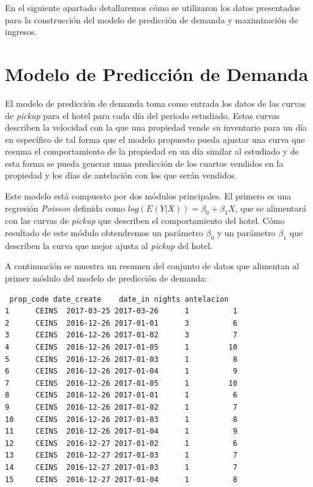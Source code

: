 En el siguiente apartado detallaremos cómo se utilizaron los datos presentados para la construcción del modelo de predicción de demanda y maximización de ingresos.


\section*{Modelo de Predicción de Demanda}

El modelo de predicción de demanda toma como entrada los datos de las curvas de \emph{pickup} para el hotel para cada día del periodo estudiado. Estas curvas describen la velocidad con la que una propiedad vende su inventario para un día en específico de tal forma que el modelo propuesto pueda ajustar una curva que resuma el comportamiento de la propiedad en un día similar al estudiado y de esta forma se pueda generar unna predicción de los cuartos vendidos en la propiedad y los días de antelación con los que serán vendidos.

Este modelo está compuesto por dos módulos principales. El primero es una regresión \emph{Poisson} definida como $log(E(Y|X)) = \beta_0 + \beta_1X$, que se alimentará con las curvas de \emph{pickup} que describen el comportamiento del hotel. Cómo resultado de este módulo obtendremos un parámetro $\beta_0$ y un parámetro $\beta_1$ que describen la curva que mejor ajusta al \emph{pickup} del hotel.

A continuación se muestra un resumen del conjunto de datos que alimentan al primer módulo del modelo de predicción de demanda:

\begin{verbatim}
 prop_code date_create    date_in nights antelacion
1      CEINS  2017-03-25 2017-03-26      1          1
2      CEINS  2016-12-26 2017-01-01      3          6
3      CEINS  2016-12-26 2017-01-02      3          7
4      CEINS  2016-12-26 2017-01-05      1         10
5      CEINS  2016-12-26 2017-01-03      1          8
6      CEINS  2016-12-26 2017-01-04      1          9
7      CEINS  2016-12-26 2017-01-05      1         10
8      CEINS  2016-12-26 2017-01-01      1          6
9      CEINS  2016-12-26 2017-01-02      1          7
10     CEINS  2016-12-26 2017-01-03      1          8
11     CEINS  2016-12-26 2017-01-04      1          9
12     CEINS  2016-12-27 2017-01-02      1          6
13     CEINS  2016-12-27 2017-01-03      1          7
14     CEINS  2016-12-27 2017-01-03      1          7
15     CEINS  2016-12-27 2017-01-04      1          8
\end{verbatim}

